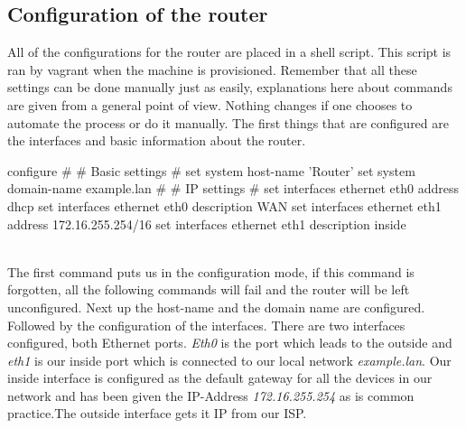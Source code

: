 \subsection{Configuration of the router}
All of the configurations for the router are placed in a shell script. This script is ran by vagrant when the machine is provisioned. Remember that all these settings can be done manually just as easily, explanations here about commands are given from a general point of view. Nothing changes if one chooses to automate the process or do it manually. The first things that are configured are the interfaces and basic information about the router.\\

\begin{cisco}[title=Basic configuration]
configure
#
# Basic settings
#
set system host-name 'Router'
set system domain-name example.lan
#
# IP settings
#
set interfaces ethernet eth0 address dhcp
set interfaces ethernet eth0 description WAN
set interfaces ethernet eth1 address 172.16.255.254/16
set interfaces ethernet eth1 description inside
\end{cisco} \\
The first command puts us in the configuration mode, if this command is forgotten, all the following commands will fail and the router will be left unconfigured. Next up the host-name and the domain name are configured. Followed by the configuration of the interfaces. There are two interfaces configured, both Ethernet ports. \textit{Eth0} is the port which leads to the outside and \textit{eth1} is our inside port which is connected to our local network \textit{example.lan}. Our inside interface is configured as the default gateway for all the devices in our network and has been given the IP-Address \textit{172.16.255.254} as is common practice.The outside interface gets it IP from our ISP.\\

